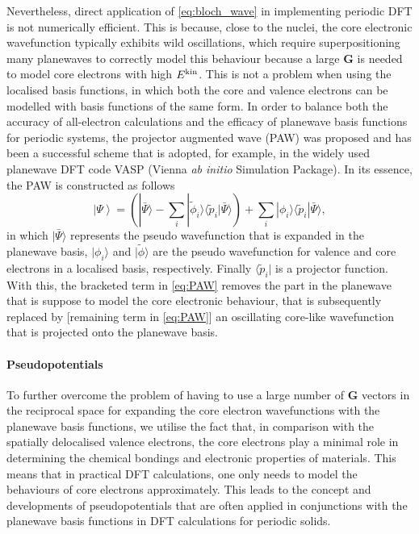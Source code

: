 Nevertheless, direct application of \cref{eq:bloch_wave} in implementing periodic DFT is not numerically efficient. This is because, close to the nuclei, the core electronic wavefunction typically exhibits wild oscillations, which require superpositioning many planewaves to correctly model this behaviour because a large $\bm{G}$ is needed to model core electrons with high $E^{\scriptsize{\mbox{kin}}}$.  This is not a problem when using the localised basis functions, in which both the core and valence electrons can be modelled with basis functions of the same form. In order to balance both the accuracy of all-electron calculations and the efficacy of planewave basis functions for periodic systems, the projector augmented wave (PAW)\cite{blochl1994projector} was proposed and has been a successful scheme that is adopted, for example, in the widely used planewave DFT code VASP (Vienna \emph{ab initio} Simulation Package).\cite{kresse1996efficient} In its essence, the PAW is constructed as follows
\begin{equation}
    \label{eq:PAW}
    \left|\Psi\right\rangle=\left(|\bar{\Psi}\rangle - \sum_i |\tilde{\phi}_i\rangle \langle\tilde{p}_i|\bar{\Psi}\rangle\right) + \sum_i |\phi_i\rangle \langle\tilde{p}_i|\bar{\Psi}\rangle,
\end{equation}
in which $|\bar{\Psi}\rangle$ represents the pseudo wavefunction that is expanded in the planewave basis, $|\phi_i\rangle$ and $|\tilde{\phi}\rangle$ are the pseudo wavefunction for valence and core electrons in a localised basis, respectively. Finally $\langle\tilde{p}_i|$ is a projector function. With this, the bracketed term in \cref{eq:PAW} removes the part in the planewave that is suppose to model the core electronic behaviour, that is subsequently replaced by [remaining term in \cref{eq:PAW}]  an oscillating core-like wavefunction that is projected onto the planewave basis.



\paragraph{\textbf{Pseudopotentials}}  To further overcome the problem of having to use a large number of $\bm{G}$ vectors in the reciprocal space for expanding the core electron wavefunctions with the planewave basis functions, we utilise the fact that, in comparison with the spatially delocalised valence electrons, the core electrons play a minimal role in determining the chemical bondings and electronic properties of materials. This means that in practical DFT calculations, one only needs to model the behaviours of core electrons approximately. This leads to the concept and developments of pseudopotentials that are often applied in conjunctions with the planewave basis functions in DFT calculations for periodic solids.



